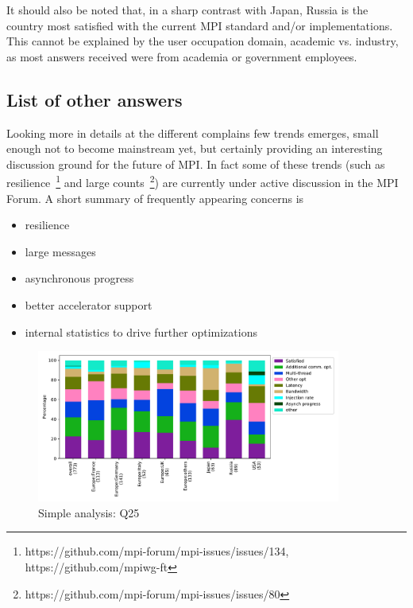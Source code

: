 It should also be noted that, in a sharp contrast with Japan, Russia is the
country most satisfied with the current MPI standard and/or implementations.
This cannot be explained by the user occupation domain, academic vs. industry,
as most answers received were from academia or government employees.
%


\subsection{List of other answers}%

Looking more in details at the different complains few trends emerges, small
enough not to become mainstream yet, but certainly providing an interesting
discussion ground for the future of MPI. In fact some of these trends (such as
resilience~\footnote{https://github.com/mpi-forum/mpi-issues/issues/134,
https://github.com/mpiwg-ft} and large
counts~\footnote{https://github.com/mpi-forum/mpi-issues/issues/80}) are
currently under active discussion in the MPI Forum.
%
A short summary of frequently appearing concerns is
\begin{itemize}
    \item resilience
    \item large messages
    \item asynchronous progress
    \item better accelerator support
    \item internal statistics to drive further optimizations
\end{itemize}

\begin{itemize}

\end{itemize}

\begin{figure}[htb]
\begin{center}
\includegraphics[width=10cm]{../pdfs/Q25.pdf}
\caption{Simple analysis: Q25}
\label{fig:Q25}
\end{center}
\end{figure}

